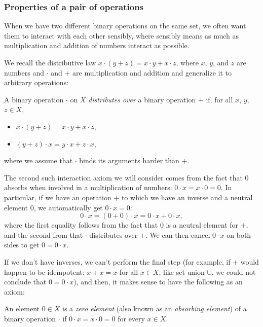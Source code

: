 \subsubsection{Properties of a pair of operations}
When we have two different binary operations on the same set, we often want them to interact with each other sensibly, where sensibly means as much as multiplication and addition of numbers interact as possible. 

We recall the distributive law $x\cdot(y + z) = x\cdot y + x\cdot z$, where $x$, $y$, and $z$ are numbers and $\cdot$ and $+$ are multiplication and addition and generalize it to arbitrary operations: 
\begin{Definition}
  A binary operation $\cdot$ on $X$ \emph{distributes over} a binary operation $+$ if, for all $x$, $y$, $z \in X$,
  \begin{itemize}
  \item $x \cdot (y + z) = x \cdot y + x \cdot z$,
  \item $(y + z) \cdot x = y \cdot x + z \cdot x$,
  \end{itemize}
  where we assume that $\cdot$ binds its arguments harder than $+$.
\end{Definition}

The second such interaction axiom we will consider comes from the fact that $0$ absorbs when involved in a multiplication of numbers: $0 \cdot x = x \cdot 0 = 0$. In particular, if we have an operation $+$ to which we have an inverse and a neutral element $0$, we automatically get $0 \cdot x = 0$:
\begin{equation*}
  0 \cdot x = (0 + 0) \cdot x = 0 \cdot x + 0 \cdot x,
\end{equation*}
where the first equality follows from the fact that $0$ is a neutral element for $+$, and the second from that $\cdot$ distributes over $+$. We can then cancel $0 \cdot x$ on both sides to get $0 = 0 \cdot x$.%

If we don't have inverses, we can't perform the final step (for example, if $+$ would happen to be idempotent: $x + x = x$ for all $x \in X$, like set union $\cup$, we could not conclude that $0 = 0 \cdot x$), and then, it makes sense to have the following as an axiom:
\begin{Definition}
  An element $0 \in X$ is a \emph{zero element} (also known as an \emph{absorbing element}) of a binary operation $\cdot$ if $0 \cdot x = x \cdot 0 = 0$ for every $x \in X$.
\end{Definition}

